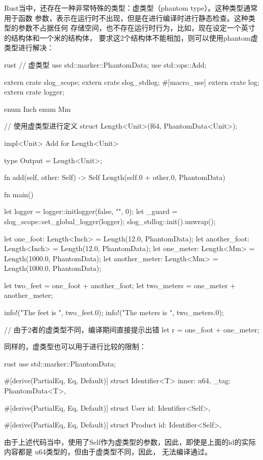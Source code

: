 Rust当中，还存在一种非常特殊的类型：虚类型（phantom type）。这种类型通常用于函数
参数，表示在运行时不出现，但是在进行编译时进行静态检查。这种类型的参数不占据任何
存储空间，也不存在运行时行为，比如，现在设定一个英寸的结构体和一个米的结构体，
要求这2个结构体不能相加，则可以使用phantom虚类型进行解决：
\begin{code-block}{rust}
// 虚类型
use std::marker::PhantomData;
use std::ops::Add;

extern crate slog_scope;
extern crate slog_stdlog;
#[macro_use]
extern crate log;
extern crate logger;

enum Inch {}
enum Mm {}

// 使用虚类型进行定义
struct Length<Unit>(f64, PhantomData<Unit>);

impl<Unit> Add for Length<Unit> {
    type Output = Length<Unit>;

    fn add(self, other: Self) -> Self {
        Length(self.0 + other.0, PhantomData)
    }
}

fn main() {
    let logger = logger::initlogger(false, "", 0);
    let _guard = slog_scope::set_global_logger(logger);
    slog_stdlog::init().unwrap();

    let one_foot: Length<Inch> = Length(12.0, PhantomData);
    let another_foot: Length<Inch> = Length(12.0, PhantomData);
    let one_meter: Length<Mm> = Length(1000.0, PhantomData);
    let another_meter: Length<Mm> = Length(1000.0, PhantomData);

    let two_feet = one_foot + another_foot;
    let two_meters = one_meter + another_meter;

    info!("The feet is {}", two_feet.0);
    info!("The meters is {}", two_meters.0);

    // 由于2者的虚类型不同，编译期间直接提示出错
    let r = one_foot + one_meter;
}
\end{code-block}
同样的，虚类型也可以用于进行比较的限制：
\begin{code-block}[escapeinside=~~, mathescape]{rust}
use std::marker::PhantomData;

#[derive(PartialEq, Eq, Default)]
struct Identifier<T> {
    inner: u64,
    _tag: PhantomData<T>,
}

#[derive(PartialEq, Eq, Default)]
struct User {
    id: Identifier<Self>,
}

#[derive(PartialEq, Eq, Default)]
struct Product {
    id: Identifier<Self>,
}
\end{code-block}
由于上述代码当中，使用了Self作为虚类型的参数，因此，即使是上面的id的实际内容都是
u64类型的，但由于虚类型不同，因此，
无法编译通过。

